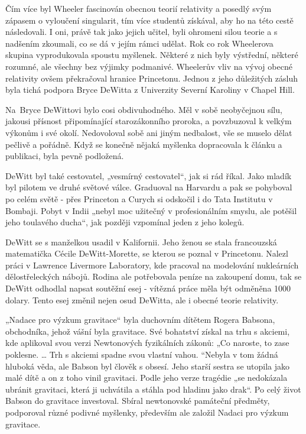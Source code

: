   Čím více byl Wheeler fascinován obecnou teorií relativity a posedlý svým zápasem o vyloučení
  singularit, tím více studentů získával, aby ho na této cestě následovali. I oni, právě tak jako
  jejich učitel, byli ohromeni silou teorie a s nadšením zkoumali, co se dá v jejím rámci udělat.
  Rok co rok Wheelerova skupina vyprodukovala spoustu myšlenek. Některé z nich byly výstřední,
  některé rozumné, ale všechny bez výjimky podmanivé. Wheelerův vliv na vývoj obecné relativity
  ovšem překračoval hranice Princetonu. Jednou z jeho důležitých zásluh byla tichá podpora Bryce
  DeWitta z Univerzity Severní Karoliny v Chapel Hill. 

  Na Bryce DeWittovi bylo cosi obdivuhodného. Měl v sobě neobyčejnou sílu, jakousi přísnost
  připomínající starozákonního proroka, a povzbuzoval k velkým výkonům i své okolí. Nedovoloval sobě
  ani jiným nedbalost, vše se muselo dělat pečlivě a pořádně. Když se konečně nějaká myšlenka
  dopracovala k článku a publikaci, byla pevně podložená. 

  DeWitt byl také cestovatel, „vesmírný cestovatel“, jak si rád říkal. Jako mladík byl pilotem ve
  druhé světové válce. Graduoval na Harvardu a pak se pohyboval po celém světě - přes Princeton a
  Curych si odskočil i do Tata Institutu v Bombaji. Pobyt v Indii „nebyl moc užitečný v
  profesionálním smyslu, ale potěšil jeho toulavého ducha“, jak později vzpomínal jeden z jeho
  kolegů. 

  DeWitt se s manželkou usadil v Kalifornii. Jeho ženou se stala francouzská matematička Cécile
  DeWitt-Morette, se kterou se poznal v Princetonu. Nalezl práci v Lawrence Livermore Laboratory,
  kde pracoval na modelování nukleárních dělostřeleckých nábojů. Rodina ale potřebovala peníze na
  zakoupení domu, tak se DeWitt odhodlal napsat soutěžní esej - vítězná práce měla být odměněna 1000
  dolary. Tento esej změnil nejen osud DeWitta, ale i obecné teorie relativity.

  „Nadace pro výzkum gravitace“ byla duchovním dítětem Rogera Babsona, obchodníka, jehož vášní byla
  gravitace. Své bohatství získal na trhu s akciemi, kde aplikoval svou verzi Newtonových
  fyzikálních zákonů: „Co naroste, to zase poklesne. … Trh s akciemi spadne svou vlastní vahou.
  “Nebyla v tom žádná hluboká věda, ale Babson byl člověk s obsesí. Jeho starší sestra se utopila
  jako malé dítě a on z toho vinil gravitaci. Podle jeho verze tragédie „se nedokázala ubránit
  gravitaci, která ji uchvátila a stáhla pod hladinu jako drak“. Po celý život Babson do gravitace
  investoval. Sbíral newtonovské památeční předměty, podporoval různé podivné myšlenky, především
  ale založil Nadaci pro výzkum gravitace. 

